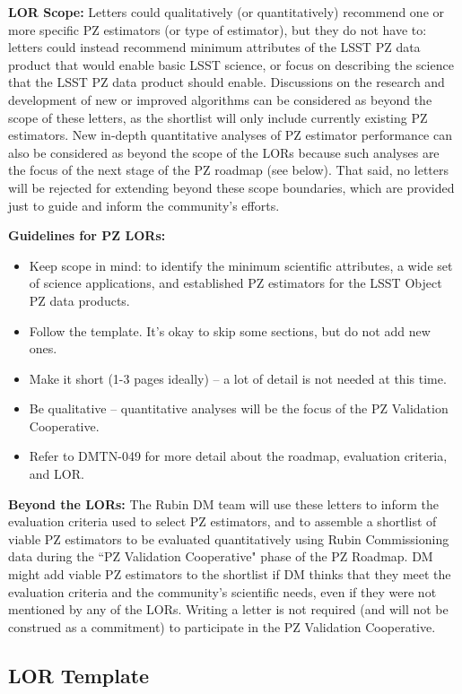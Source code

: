 \documentclass[DM,authoryear,toc]{lsstdoc}
\begin{document}
\textbf{LOR Scope:}
Letters could qualitatively (or quantitatively) recommend one or more specific PZ estimators (or type of estimator), but they do not have to: letters could instead recommend minimum attributes of the LSST PZ data product that would enable basic LSST science, or focus on describing the science that the LSST PZ data product should enable.
Discussions on the research and development of new or improved algorithms can be considered as beyond the scope of these letters, as the shortlist will only include currently existing PZ estimators. 
New in-depth quantitative analyses of PZ estimator performance can also be considered as beyond the scope of the LORs because such analyses are the focus of the next stage of the PZ roadmap (see below).
That said, no letters will be rejected for extending beyond these scope boundaries, which are provided just to guide and inform the community's efforts. 

\textbf{Guidelines for PZ LORs:}
\begin{itemize}
\item Keep scope in mind: to identify the minimum scientific attributes, a wide set of science applications, and established PZ estimators for the LSST Object PZ data products.
\item Follow the template. It's okay to skip some sections, but do not add new ones.
\item Make it short (1-3 pages ideally) -- a lot of detail is not needed at this time.
\item Be qualitative -- quantitative analyses will be the focus of the PZ Validation Cooperative.
\item Refer to DMTN-049 for more detail about the roadmap, evaluation criteria, and LOR.
\end{itemize}

\textbf{Beyond the LORs:}
The Rubin DM team will use these letters to inform the evaluation criteria used to select PZ estimators, and to assemble a shortlist of viable PZ estimators to be evaluated quantitatively using Rubin Commissioning data during the ``PZ Validation Cooperative" phase of the PZ Roadmap.
DM might add viable PZ estimators to the shortlist if DM thinks that they meet the evaluation criteria and the community's scientific needs, even if they were not mentioned by any of the LORs.
Writing a letter is not required (and will not be construed as a commitment) to participate in the PZ Validation Cooperative. 

\subsection{LOR Template}
\end{document}
